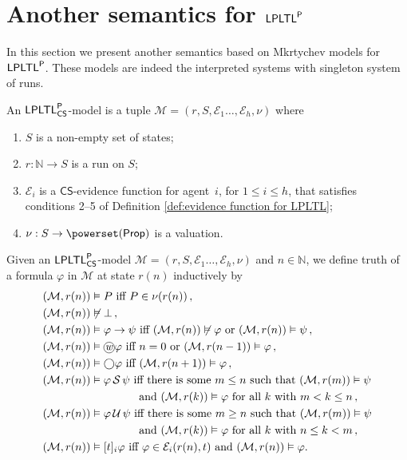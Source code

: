 \documentclass[envcountsect,envcountsame,oribibl,orivec]{llncs}
\newcommand*\circled[1]{\tikz[baseline=(char.base)]{
		\node[shape=circle,draw,inner sep=0.4pt] (char) {#1};}}
\newcommand{\Prop}{\textsf{Prop}}
\newcommand{\lfalse}{\bot}
\newcommand{\limplies}{\rightarrow}
\newcommand{\lnext}{\bigcirc}
\newcommand{\luntil}{{\,\mathcal{U}\,}}
\newcommand{\lsince}{{\,\mathcal{S}\,}}
\newcommand{\wprevious}{\circled{\textit{w}}}
\newcommand{\LPLTLp}{\textsf{LPLTL}^{\sf P}}
\newcommand{\jbox}[1]{\left[#1\right]\!}
\newcommand{\CS}{\textsf{CS}}
\newcommand{\numberofagents}{h}
\newcommand{\agent}{i}
\newcommand{\evidence}{\mathcal{E}}
\newcommand{\valuation}{\nu}
\newcommand{\entails}{\vDash}
\newcommand{\M}{\mathcal{M}}
\newcommand{\N}{\mathbb{N}}
\renewcommand{\phi}{\varphi}
\begin{document}
\section{Another semantics for $\LPLTLp$}
\label{sec:Mkrtychev models aditional principles}

In this section we present another semantics based on Mkrtychev models \cite{Mkr97LFCS} for $\LPLTLp$. These models are indeed the interpreted systems with singleton system of runs.


\begin{definition}\label{def:M-models LPLTLp}
 An $\LPLTLp_\CS$-model is a tuple
$
\M = (r,S,\evidence_1\ldots,\evidence_\numberofagents, \valuation)
$ 
where
\begin{enumerate}
	\item  $S$ is a non-empty set of states;
	\item $r : \mathbb{N} \to S$ is a run on $S$;
	\item $\evidence_\agent$ is a $\CS$-evidence function for agent~$\agent$, for $1 \leq \agent \leq \numberofagents$, that satisfies conditions 2--5 of Definition \ref{def:evidence function for LPLTL};
	\item $\valuation: S \to \powerset(\Prop)$ is a valuation.
\end{enumerate}
\end{definition}

%
Given an $\LPLTLp_\CS$-model $\M = (r,S,\evidence_1\ldots,\evidence_\numberofagents, \valuation)$
and  $n \in \N$, we define truth of a formula $\phi$ in $\M$ at state $r(n)$ inductively by 
\begin{align*}
(\M, r(n)) &\entails P \text{ iff } P \in \valuation(r(n)) \, ,\\
(\M, r(n)) &\not\entails \lfalse \, ,\\
(\M, r(n)) &\entails \phi \limplies \psi \text{ iff } (\M, r(n)) \not\entails \phi \text{ or } (\M, r(n)) \entails \psi \, ,\\
(\M, r(n)) &\entails \wprevious \phi \text{ iff $n=0$ or } (\M, r(n-1)) \entails \phi \, ,\\
(\M, r(n)) &\entails \lnext \phi \text{ iff } (\M, r(n+1)) \entails \phi \, ,\\
(\M, r(n)) &\entails \phi \lsince \psi \text{ iff there is some } m \leq n \text{ such that } (\M,  r(m)) \entails \psi \\ & \qquad\qquad \text{ and } (\M, r(k)) \entails \phi \text{ for all $k$ with } m < k \leq n \, ,\\
(\M, r(n)) &\entails \phi \luntil \psi \text{ iff there is some } m \geq n \text{ such that } (\M, r(m)) \entails \psi \\ & \qquad\qquad \text{ and } (\M, r(k)) \entails \phi \text{ for all $k$ with } n \leq k < m \, ,\\
(\M, r(n)) &\entails \jbox{t}_\agent \phi \text{ iff }   \phi \in \evidence_\agent(r(n),t ) \text { and } (\M, r(n)) \entails \phi.
\end{align*}
\end{document}
